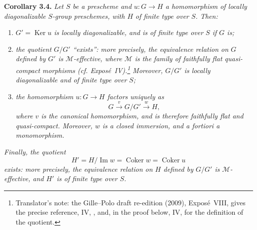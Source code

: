 \medskip
\noindent{}\textbf{Corollary 3.4.}
\textit{Let \(S\) be a prescheme and \(u:G\to H\) a homomorphism of
locally diagonalizable \(S\)-group preschemes, with \(H\) of finite type over
\(S\). Then:}
\begin{enumerate}
  \item[(a)]
  \textit{\(G'=\operatorname{Ker}u\) is locally diagonalizable, and is of
  finite type over \(S\) if \(G\) is;}

  \item[(b)]
  \textit{the quotient \(G/G'\) ``exists'': more precisely, the
  equivalence relation on \(G\) defined by \(G'\) is
  \(\mathcal M\)-effective, where \(\mathcal M\) is the family of
  faithfully flat quasi-compact morphisms (cf. Expos\'e~IV).\footnote{Translator's note: the
  Gille--Polo draft re-edition (2009), Expos\'e~VIII, gives the precise reference, IV,
  , and, in the proof below, IV,
   for the definition of the quotient.} Moreover, \(G/G'\) is
  locally diagonalizable and of finite type over \(S\);}

  \item[(c)]
  \textit{the homomorphism \(u:G\to H\) factors uniquely as}
  \[
    G\xrightarrow{v}G/G'\xrightarrow{w}H,
  \]
  \textit{where \(v\) is the canonical homomorphism, and is therefore
  faithfully flat and quasi-compact. Moreover, \(w\) is a closed
  immersion, and a fortiori a monomorphism.}
\end{enumerate}
\textit{Finally, the quotient}
\[
  H'=H/\operatorname{Im}w
    =\operatorname{Coker}w
    =\operatorname{Coker}u
\]
\textit{exists: more precisely, the equivalence relation on \(H\)
defined by \(G/G'\) is \(\mathcal M\)-effective, and \(H'\) is of finite
type over \(S\).}

